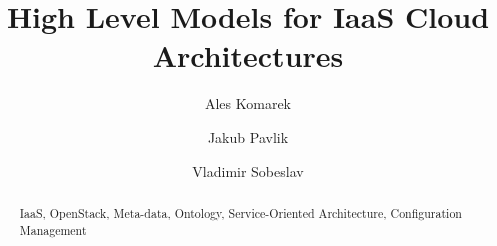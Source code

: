 \documentclass[runningheads,a4paper]{llncs}
\newcommand{\keywords}[1]{\par\addvspace\baselineskip
\noindent\keywordname\enspace\ignorespaces#1}
\begin{document}
\mainmatter  %

\title{High Level Models for IaaS Cloud Architectures}


%
%
\author{Ales Komarek\and Jakub Pavlik\and Vladimir Sobeslav}
%



%
%

\maketitle

\begin{abstract}

\keywords{IaaS, OpenStack, Meta-data, Ontology, Service-Oriented Architecture, Configuration Management}

\end{abstract}



%




\begin{thebibliography}{4}



\end{thebibliography}
\end{document}
